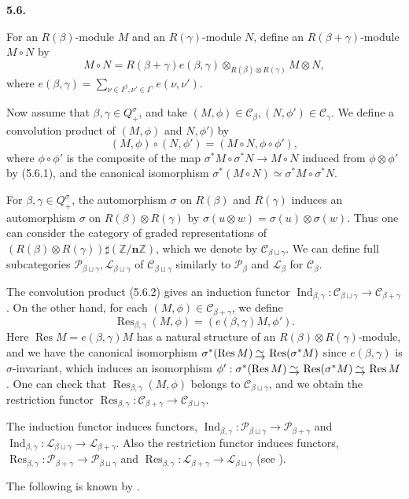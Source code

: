 \documentclass[12pt]{amsart}
\renewcommand\b{\beta}
\newcommand\g{\gamma}
\newcommand\s{\sigma}
\newcommand\f{\phi}
\renewcommand{\1}{\mathbb 1}
\newcommand{\ZZ}{\mathbb Z}
\newcommand\Bn{\mathbf n}
\newcommand\SC{\mathscr{C}}
\newcommand\SL{\mathscr{L}}
\newcommand\SP{\mathscr{P}}
\newcommand\Ind{\operatorname{Ind}}
\newcommand\Res{\operatorname{Res}}
\newcommand{\isom}{\,\raise2pt\hbox{$\underrightarrow{\sim}$}\,}
\numberwithin{equation}{section}
\def \para#1{\par\medskip\textbf{#1}
              \addtocounter{thm}{1}}
\begin{document}
\para{5.6.}
For an $R(\b)$-module $M$ and an $R(\g)$-module $N$, define an $R(\b + \g)$-module 
$M\circ N$ by
\begin{equation*}
\tag{5.6.1}  
M\circ N = R(\b + \g)e(\b,\g)\otimes_{R(\b)\otimes R(\g)}M \otimes N, 
\end{equation*}
where $e(\b,\g) = \sum_{\nu \in I^{\b}, \nu' \in I^{\g}}e(\nu,\nu')$. 
\par
Now assume that $\b, \g \in Q_+^{\s}$, and take
$(M,\f) \in \SC_{\b}, (N, \f') \in \SC_{\g}$.
We define a convolution product of $(M, \f)$ and $N, \f')$ by 
\begin{equation*}
\tag{5.6.2}  
(M,\f) \circ (N,\f') = (M\circ N, \f\circ \f'),
\end{equation*}  
where $\f\circ \f'$ is the composite of the map
$\s^*M \circ \s^*N \to M \circ N$ induced from $\f \otimes \f'$ by (5.6.1), 
and the canonical isomorphism $\s^*(M \circ N) \simeq \s^*M \circ \s^*N$. 
\par
For $\b,\g \in Q_+^{\s}$, the automorphism $\s$ on $R(\b)$ and $R(\g)$ induces
an automorphism $\s$ on $R(\b) \otimes R(\g)$ by $\s(u \otimes w) = \s(u)\otimes \s(w)$.
Thus one can consider the category of graded representations of
$(R(\b)\otimes R(\g))\sharp(\ZZ/\Bn\ZZ)$, which we denote by $\SC_{\b \sqcup \g}$.
We can define full subcategories $\SP_{\b \sqcup \g}, \SL_{\b \sqcup \g}$
of $\SC_{\b\sqcup \g}$ similarly to $\SP_{\b}$ and $\SL_{\b}$ for $\SC_{\b}$. 
\par
The convolution product (5.6.2) gives an induction functor
$\Ind_{\b,\g} : \SC_{\b\sqcup\g} \to \SC_{\b+\g}$.
On the other hand, for each $(M, \f) \in \SC_{\b+\g}$, we define
\begin{equation*}
\tag{5.6.3}  
\Res_{\b,\g}(M,\f) = (e(\b,\g)M, \f').
\end{equation*}
Here $\Res M = e(\b,\g)M$ has a natural structure of an $R(\b)\otimes R(\g)$-module,
and we have the canonical isomorphism $\s^*(\Res M) \isom \Res (\s^*M)$ since
$e(\b,\g)$ is $\s$-invariant, which induces an isomorphism
$\f' : \s^*(\Res M) \isom \Res (\s^*M) \isom \Res M$.  
One can check that $\Res_{\b,\g}(M,\f)$ belongs to $\SC_{\b \sqcup \g}$, and we obtain
the restriction functor $\Res_{\b, \g} : \SC_{\b + \g} \to \SC_{\b \sqcup \g}$. 
\par
The induction functor induces functors,
$\Ind_{\b,\g}: \SP_{\b \sqcup \g} \to \SP_{\b + \g}$ and
$\Ind_{\b,\g}: \SL_{\b \sqcup \g} \to \SL_{\b + \g}$.
Also the restriction functor induces functors,
$\Res_{\b,\g}: \SP_{\b + \g} \to \SP_{\b \sqcup \g}$ and
$\Res_{\b,\g}: \SL_{\b + \g} \to \SL_{\b \sqcup \g}$ (see \cite [Thm. 4.6]{M}).
\par
The following is known by \cite [Thm. 4.3]{M}.
\end{document}
